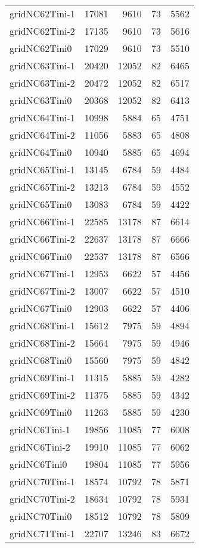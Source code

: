\begin{longtable}{lrrrr}
gridNC62Tini-1 & 17081 & 9610 & 73 & 5562 \\
gridNC62Tini-2 & 17135 & 9610 & 73 & 5616 \\
gridNC62Tini0 & 17029 & 9610 & 73 & 5510 \\
gridNC63Tini-1 & 20420 & 12052 & 82 & 6465 \\
gridNC63Tini-2 & 20472 & 12052 & 82 & 6517 \\
gridNC63Tini0 & 20368 & 12052 & 82 & 6413 \\
gridNC64Tini-1 & 10998 & 5884 & 65 & 4751 \\
gridNC64Tini-2 & 11056 & 5883 & 65 & 4808 \\
gridNC64Tini0 & 10940 & 5885 & 65 & 4694 \\
gridNC65Tini-1 & 13145 & 6784 & 59 & 4484 \\
gridNC65Tini-2 & 13213 & 6784 & 59 & 4552 \\
gridNC65Tini0 & 13083 & 6784 & 59 & 4422 \\
gridNC66Tini-1 & 22585 & 13178 & 87 & 6614 \\
gridNC66Tini-2 & 22637 & 13178 & 87 & 6666 \\
gridNC66Tini0 & 22537 & 13178 & 87 & 6566 \\
gridNC67Tini-1 & 12953 & 6622 & 57 & 4456 \\
gridNC67Tini-2 & 13007 & 6622 & 57 & 4510 \\
gridNC67Tini0 & 12903 & 6622 & 57 & 4406 \\
gridNC68Tini-1 & 15612 & 7975 & 59 & 4894 \\
gridNC68Tini-2 & 15664 & 7975 & 59 & 4946 \\
gridNC68Tini0 & 15560 & 7975 & 59 & 4842 \\
gridNC69Tini-1 & 11315 & 5885 & 59 & 4282 \\
gridNC69Tini-2 & 11375 & 5885 & 59 & 4342 \\
gridNC69Tini0 & 11263 & 5885 & 59 & 4230 \\
gridNC6Tini-1 & 19856 & 11085 & 77 & 6008 \\
gridNC6Tini-2 & 19910 & 11085 & 77 & 6062 \\
gridNC6Tini0 & 19804 & 11085 & 77 & 5956 \\
gridNC70Tini-1 & 18574 & 10792 & 78 & 5871 \\
gridNC70Tini-2 & 18634 & 10792 & 78 & 5931 \\
gridNC70Tini0 & 18512 & 10792 & 78 & 5809 \\
gridNC71Tini-1 & 22707 & 13246 & 83 & 6672 \\

\end{longtable}
